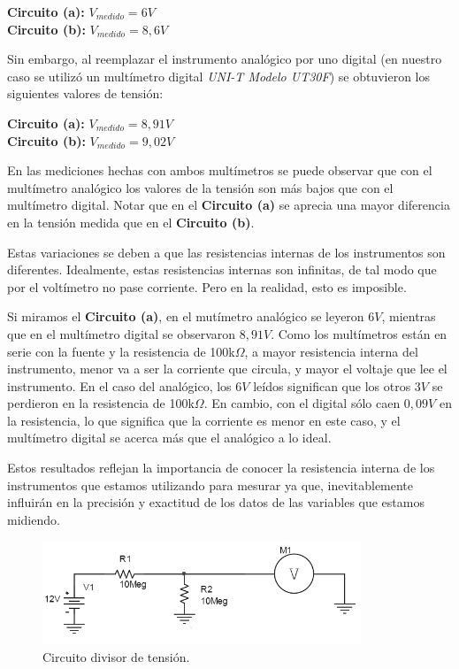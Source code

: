 \documentclass{article}
\begin{document}
	\indent \textbf{Circuito (a):} $V_{medido} = 6V$ \smallskip\\
	\indent \textbf{Circuito (b):} $V_{medido} = 8,6V$ \\
	\medskip

	Sin embargo, al reemplazar el instrumento analógico por uno digital (en nuestro caso se utilizó un multímetro digital \textit{UNI-T Modelo UT30F}) se obtuvieron los siguientes valores de tensión:
\bigskip

	\indent \textbf{Circuito (a):} $V_{medido} = 8,91V$ \smallskip\\
	\indent \textbf{Circuito (b):} $V_{medido} = 9,02V$ \\
	\bigskip



\newpage
	En las mediciones hechas con ambos multímetros se puede observar que con el multímetro analógico los valores de la tensión son más bajos que con el multímetro digital. Notar que en el \textbf{Circuito (a)} se aprecia una mayor diferencia en la tensión medida que en el \textbf{Circuito (b)}.
	\par
	Estas variaciones se deben a que las resistencias internas de los instrumentos son diferentes. Idealmente, estas resistencias internas son infinitas, de tal modo que por el voltímetro no pase corriente. Pero en la realidad, esto es imposible.
	\par
	Si miramos el \textbf{Circuito (a)}, en el mutímetro analógico se leyeron $6V$, mientras que en el multímetro digital se observaron $8,91V$. Como los multímetros están en serie con la fuente y la resistencia de 100k$\Omega$, a mayor resistencia interna del instrumento, menor va a ser la corriente que circula, y mayor el voltaje que lee el instrumento. En el caso del analógico, los $6V$ leídos significan que los otros $3V$ se perdieron en la resistencia de 100k$\Omega$. En cambio, con el digital sólo caen $0,09V$ en la resistencia, lo que significa que la corriente es menor en este caso, y el multímetro digital se acerca más que el analógico a lo ideal.
	\par
	Estos resultados reflejan la importancia de conocer la resistencia interna de los instrumentos que estamos utilizando para mesurar ya que, inevitablemente influirán en la precisión y exactitud de los datos de las variables que estamos midiendo.
\bigskip

\begin{figure}[h]
	\centering
	\includegraphics[width=0.85\textwidth]{images/p1-item-8.jpg}
	\caption{Circuito divisor de tensión.}
\end{figure}
\bigskip\bigskip
\end{document}
